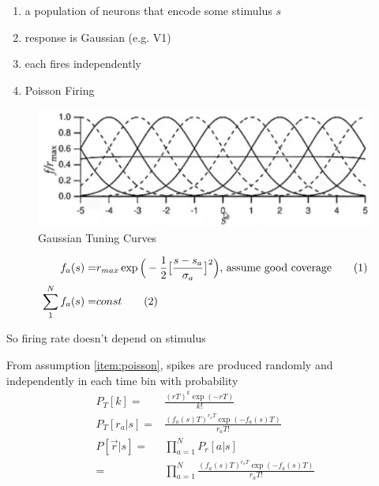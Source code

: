 \documentclass[]{article}
\newcommand\numberthis{\addtocounter{equation}{1}\tag{\theequation}}
\begin{document}
\begin{enumerate}
	\item a population of neurons that encode some stimulus $s$
	\item response is Gaussian (e.g. V1)
	\item each fires independently
	\item Poisson Firing\label{item:poisson}
\end{enumerate}

\begin{figure}[H]
	\caption{Gaussian Tuning Curves}
	\includegraphics[width=\textwidth]{decode-stimulus}
\end{figure}

\begin{align*}
	f_a(s) =& r_{max} \exp \Big(-\frac{1}{2}\big[\frac{s-s_a}{\sigma_a}\big]^2\Big)\text{, assume good coverage} \numberthis \label{eq:gauss}\\
	\sum_{1}^{N} f_a(s) =& const \numberthis \label{eq:good:coverage}
\end{align*}

So firing rate doesn't depend on stimulus

From assumption \ref{item:poisson}, spikes are produced randomly and independently in each time bin with probability
\begin{align*}
	P_T[k] =& \frac{(rT)^k \exp (-rT)}{k!}\\
	P_T[r_a\vert s] =& \frac{(f_a(s)T)^{r_aT} \exp (-f_a(s)T)}{r_aT!}\\
	P[\vec{r}\vert s] =& \prod_{a=1}^{N}P_r[a\vert s]\\
	=& \prod_{a=1}^{N} \frac{(f_a(s)T)^{r_aT} \exp (-f_a(s)T)}{r_aT!}
\end{align*}
\end{document}

